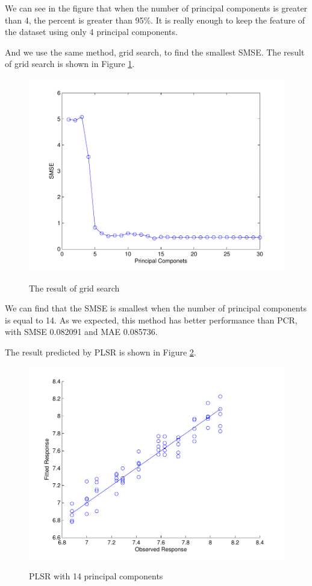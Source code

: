 \documentclass[a4paper]{article}
\begin{document}
We can see in the figure that when the number of principal components is greater than 4, the percent is greater than 95\%. It is really enough to keep the feature of the dataset using only 4 principal components.

And we use the same method, grid search, to find the smallest SMSE. The result of grid search is shown in Figure \ref{plsrb2}.
\begin{figure}[h]
  \centering
  \includegraphics[width=.6\textwidth]{images/gsearch_PLSR.pdf}\\
  \caption{The result of grid search}\label{plsrb2}
\end{figure}

\newpage
We can find that the SMSE is smallest when the number of principal components is equal to 14. As we expected, this method has better performance than PCR, with SMSE 0.082091 and MAE 0.085736. 

The result predicted by PLSR is shown in Figure \ref{pic6}.
\begin{figure}[h]
  \centering
  \includegraphics[width=.6\textwidth]{images/predict_PLSR.pdf}\\
  \caption{PLSR with 14 principal components}\label{pic6}
\end{figure}
\end{document}
